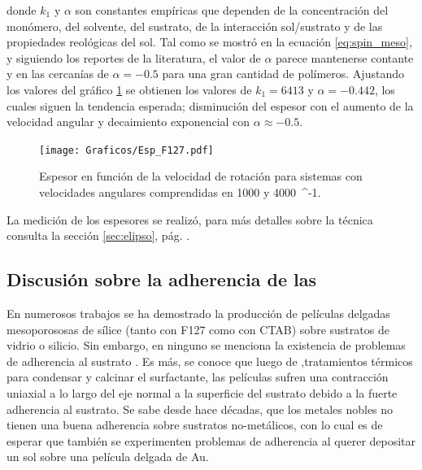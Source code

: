 		donde $k_1$ y $\alpha$ son constantes empíricas que dependen de la concentración del monómero, del solvente, del sustrato, de la interacción sol/sustrato y  de las propiedades reológicas del sol. Tal como se mostró en la ecuación \ref{eq:spin_meso}, y siguiendo los reportes de la literatura, el valor de $\alpha$ parece mantenerse contante y en las cercanías de $\alpha=-0.5$ para una gran cantidad de polímeros. Ajustando los valores del gráfico \ref{fig:esp} se obtienen los valores de $k_1=6413$ y  $\alpha=-0.442$, los cuales siguen la tendencia esperada; disminución del espesor con el aumento de la velocidad angular y decaimiento exponencial con $\alpha \approx -0.5$. 
			\begin{figure}[!ht]
						\begin{center}
						\texttt{[image: Graficos/Esp\_F127.pdf]}
						\caption[Espesor en función de la velocidad de rotación.]{Espesor en función de la velocidad de rotación para sistemas \pdmF con velocidades angulares comprendidas en 1000 y \SI{4000}{\minute^{-1}.}}
						\label{fig:esp}
						\end{center}
						\end{figure}

		La medición de los espesores se realizó, para más detalles sobre la técnica consulta la sección \ref{sec:elipso}, pág. \pageref{sec:elipso}.
		
	\subsection{Discusión sobre la adherencia de las \pdm}	

		 En numerosos trabajos se ha demostrado la producción de películas delgadas mesoporososas de sílice (tanto con F127 como con CTAB) sobre sustratos de vidrio o silicio. Sin embargo, en ninguno se menciona la existencia de problemas de adherencia al sustrato \cite{Angelome2008,Fuertes2010,Violi2015}. Es más, se conoce que luego de ,tratamientos térmicos para condensar y calcinar el surfactante, las películas sufren una contracción uniaxial a lo largo del eje normal a la superficie del sustrato debido a la fuerte adherencia al sustrato.\cite{Grosso2004,Soler-Illia2012,Chougnet2005} Se sabe desde hace décadas, que los metales nobles no tienen una buena adherencia sobre sustratos no-metálicos\cite{Kern1990,Hieber1976}, con lo cual es de esperar que también se experimenten problemas de adherencia al querer depositar un sol sobre una película delgada de Au. 

